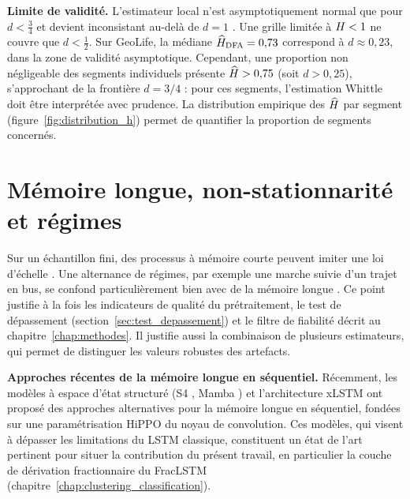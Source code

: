 \medskip
\textbf{Limite de validité.} L'estimateur local n'est asymptotiquement normal que pour $d < \frac{3}{4}$ et devient inconsistant au-delà de $d = 1$ \cite{robinson1995b}. Une grille limitée à $H < 1$ ne couvre que $d < \frac{1}{2}$. Sur GeoLife, la médiane $\widehat{H}_{\text{DFA}} = 0{,}73$ correspond à $d \approx 0{,}23$, dans la zone de validité asymptotique. Cependant, une proportion non négligeable des segments individuels présente $\widehat{H} > 0{,}75$ (soit $d > 0{,}25$), s'approchant de la frontière $d = 3/4$ : pour ces segments, l'estimation Whittle doit être interprétée avec prudence. La distribution empirique des $\widehat{H}$ par segment (figure~\ref{fig:distribution_h}) permet de quantifier la proportion de segments concernés.

\section{Mémoire longue, non-stationnarité et régimes}
\label{sec:regimes}
Sur un échantillon fini, des processus à mémoire courte peuvent imiter une loi d'échelle \cite{maraun2004}. Une alternance de régimes, par exemple une marche suivie d'un trajet en bus, se confond particulièrement bien avec de la mémoire longue \cite{klemes1974}. Ce point justifie à la fois les indicateurs de qualité du prétraitement, le test de dépassement (section~\ref{sec:test_depassement}) et le filtre de fiabilité décrit au chapitre~\ref{chap:methodes}. Il justifie aussi la combinaison de plusieurs estimateurs, qui permet de distinguer les valeurs robustes des artefacts.

\medskip
\textbf{Approches récentes de la mémoire longue en séquentiel.} Récemment, les modèles à espace d'état structuré (S4 \cite{gu2022}, Mamba \cite{gu2023}) et l'architecture xLSTM \cite{beck2024} ont proposé des approches alternatives pour la mémoire longue en séquentiel, fondées sur une paramétrisation HiPPO \cite{gu2020} du noyau de convolution. Ces modèles, qui visent à dépasser les limitations du LSTM classique, constituent un état de l'art pertinent pour situer la contribution du présent travail, en particulier la couche de dérivation fractionnaire du FracLSTM (chapitre~\ref{chap:clustering_classification}).

